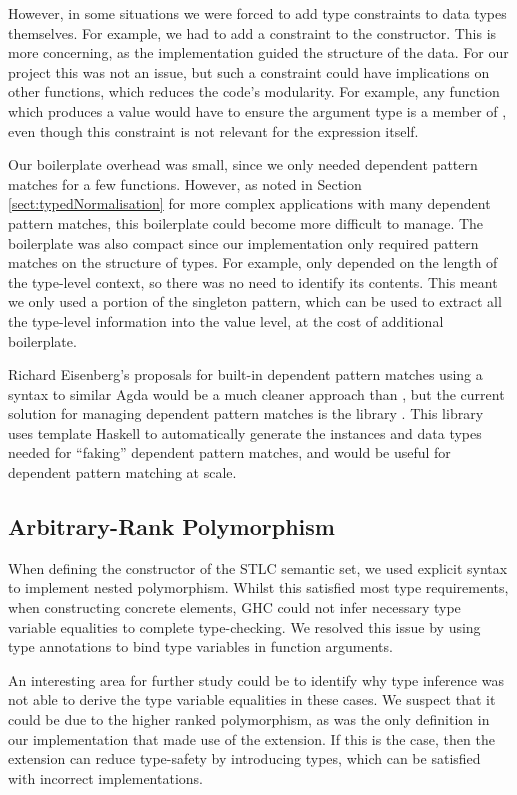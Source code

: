 However, in some situations we were forced to add type constraints to data types themselves. For example, we had to add a  constraint to the  constructor. This is more concerning, as the implementation guided the structure of the data. For our project this was not an issue, but such a constraint could have implications on other functions, which reduces the code's modularity. For example, any function which produces a  value would have to ensure the argument type is a member of , even though this constraint is not relevant for the expression itself.

Our boilerplate overhead was small, since we only needed dependent pattern matches for a few functions. However, as noted in Section \ref{sect:typedNormalisation} for more complex applications with many dependent pattern matches, this boilerplate could become more difficult to manage. The boilerplate was also compact since our implementation only required pattern matches on the structure of types. For example,  only depended on the length of the type-level context, so there was no need to identify its contents. This meant we only used a portion of the singleton pattern, which can be used to extract all the type-level information into the value level, at the cost of additional boilerplate.

Richard Eisenberg's proposals for built-in dependent pattern matches using a syntax to similar Agda would be a much cleaner approach than , but the current solution for managing dependent pattern matches is the  library \cite{singletonLibrary}. This library uses template Haskell to automatically generate the instances and data types needed for “faking” dependent pattern matches, and would be useful for dependent pattern matching at scale.

\subsection{Arbitrary-Rank Polymorphism}
\label{subsect:rankNTypes}

When defining the  constructor of the STLC semantic set, we used explicit  syntax to implement nested polymorphism. Whilst this satisfied most type requirements, when constructing concrete  elements, GHC could not infer necessary type variable equalities to complete type-checking. We resolved this issue by using type annotations to bind type variables in function arguments. 

An interesting area for further study could be to identify why type inference was not able to derive the type variable equalities in these cases. We suspect that it could be due to the higher ranked polymorphism, as  was the only definition in our implementation that made use of the  extension. If this is the case, then the  extension can reduce type-safety by introducing  types, which can be satisfied with incorrect implementations.
